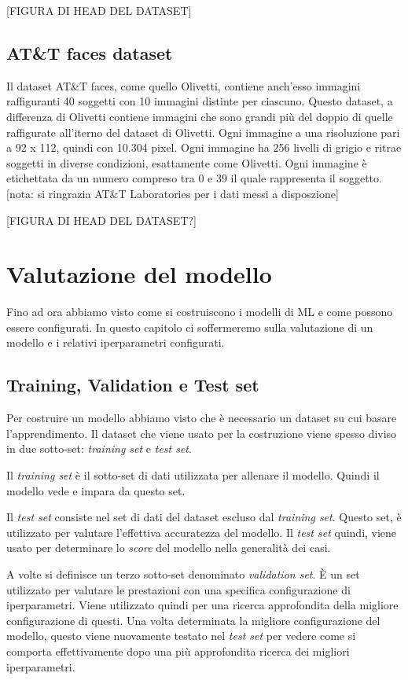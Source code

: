 \documentclass[12pt,italian]{report}
\begin{document}
[FIGURA DI HEAD DEL DATASET]


\subsection{AT\&T faces dataset}
Il dataset AT\&T faces, come quello Olivetti, contiene anch'esso immagini raffiguranti 40 soggetti con 10 immagini distinte per ciascuno. Questo dataset, a differenza di Olivetti contiene immagini che sono grandi più del doppio di quelle raffigurate all'iterno del dataset di Olivetti. Ogni immagine a una risoluzione pari a 92 x 112, quindi con 10.304 pixel. Ogni immagine ha 256 livelli di grigio e ritrae soggetti in diverse condizioni, esattamente come Olivetti. Ogni immagine è etichettata da un numero compreso tra 0 e 39 il quale rappresenta il soggetto.[nota: si ringrazia AT\&T Laboratories per i dati messi a disposzione] 

[FIGURA DI HEAD DEL DATASET?]

\section{Valutazione del modello}
Fino ad ora abbiamo visto come si costruiscono i modelli di ML e come possono essere configurati. In questo capitolo ci soffermeremo sulla valutazione di un modello e i relativi iperparametri configurati.

\subsection{Training, Validation e Test set}
Per costruire un modello abbiamo visto che è necessario un dataset su cui basare l'apprendimento. Il dataset che viene usato per la costruzione viene spesso diviso in due sotto-set: \emph{training set} e \emph{test set}.

Il \emph{training set} è il sotto-set di dati utilizzata per allenare il modello. Quindi il modello vede e impara da questo set.

Il \emph{test set} consiste nel set di dati del dataset escluso dal \emph{training set}. Questo set, è utilizzato per valutare l'effettiva accuratezza del modello. 
Il \emph{test set} quindi, viene usato per determinare lo \emph{score} del modello nella generalità dei casi.

A volte si definisce un terzo sotto-set denominato \emph{validation set}. È un set utilizzato per valutare le prestazioni con una specifica configurazione di iperparametri. Viene utilizzato quindi per una ricerca approfondita della migliore configurazione di questi. Una volta determinata la migliore configurazione del modello, questo viene nuovamente testato nel \emph{test set} per vedere come si comporta effettivamente dopo una più approfondita ricerca dei migliori iperparametri.
\end{document}
